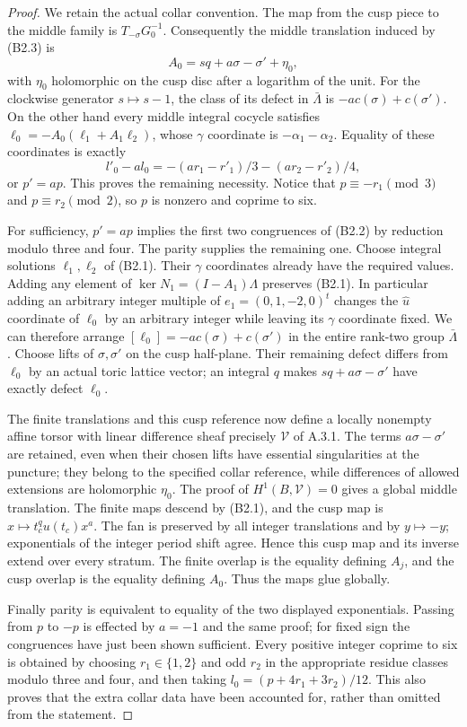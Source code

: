 \begin{proof}
We retain the actual collar convention. The map from the cusp piece to the middle family is $T_{-\sigma}G_0^{-1}$. Consequently the middle translation induced by (B2.3) is
\[
 A_0=sq+a\sigma-\sigma'+\eta_0,
\]
with $\eta_0$ holomorphic on the cusp disc after a logarithm of the unit. For the clockwise generator $s\mapsto s-1$, the class of its defect in $\bar\Lambda$ is $-a c(\sigma)+c(\sigma')$. On the other hand every middle integral cocycle satisfies
$\ell_0=-A_0(\ell_1+A_1\ell_2)$, whose $\gamma$ coordinate is $-\alpha_1-\alpha_2$. Equality of these coordinates is exactly
\[
 l'_0-a l_0=-(ar_1-r'_1)/3-(ar_2-r'_2)/4,
\]
or $p'=ap$. This proves the remaining necessity. Notice that $p\equiv-r_1\pmod3$ and $p\equiv r_2\pmod2$, so $p$ is nonzero and coprime to six.

For sufficiency, $p'=ap$ implies the first two congruences of (B2.2) by reduction modulo three and four. The parity supplies the remaining one. Choose integral solutions $\ell_1,\ell_2$ of (B2.1). Their $\gamma$ coordinates already have the required values. Adding any element of $\ker N_1=(I-A_1)\Lambda$ preserves (B2.1). In particular adding an arbitrary integer multiple of $e_1=(0,1,-2,0)^t$ changes the $\widehat u$ coordinate of $\ell_0$ by an arbitrary integer while leaving its $\gamma$ coordinate fixed. We can therefore arrange
$[\ell_0]=-a c(\sigma)+c(\sigma')$ in the entire rank-two group $\bar\Lambda$. Choose lifts of $\sigma,\sigma'$ on the cusp half-plane. Their remaining defect differs from $\ell_0$ by an actual toric lattice vector; an integral $q$ makes $sq+a\sigma-\sigma'$ have exactly defect $\ell_0$.

The finite translations and this cusp reference now define a locally nonempty affine torsor with linear difference sheaf precisely $\mathcal V$ of A.3.1. The terms $a\sigma-\sigma'$ are retained, even when their chosen lifts have essential singularities at the puncture; they belong to the specified collar reference, while differences of allowed extensions are holomorphic $\eta_0$. The proof of $H^1(B,\mathcal V)=0$ gives a global middle translation. The finite maps descend by (B2.1), and the cusp map is $x\mapsto t_c^qu(t_c)x^a$. The fan is preserved by all integer translations and by $y\mapsto-y$; exponentials of the integer period shift agree. Hence this cusp map and its inverse extend over every stratum. The finite overlap is the equality defining $A_j$, and the cusp overlap is the equality defining $A_0$. Thus the maps glue globally.

Finally parity is equivalent to equality of the two displayed exponentials. Passing from $p$ to $-p$ is effected by $a=-1$ and the same proof; for fixed sign the congruences have just been shown sufficient. Every positive integer coprime to six is obtained by choosing $r_1\in\{1,2\}$ and odd $r_2$ in the appropriate residue classes modulo three and four, and then taking $l_0=(p+4r_1+3r_2)/12$. This also proves that the extra collar data have been accounted for, rather than omitted from the statement.
\end{proof}

